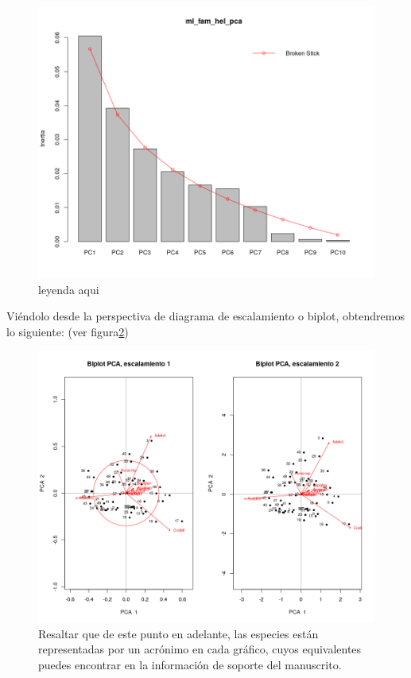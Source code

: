 \documentclass[11pt,]{article}
\begin{document}
\begin{figure}
\centering
\includegraphics{quebrada_especie.png}
\caption{\label{fig:quebrada_especie}leyenda aqui}
\end{figure}

Viéndolo desde la perspectiva de diagrama de escalamiento o biplot,
obtendremos lo siguiente: (ver figura\ref{fig:biplot_especie})

\begin{figure}
\centering
\includegraphics{biplot_especie.png}
\caption{\label{fig:biplot_especie}Resaltar que de este punto en
adelante, las especies están representadas por un acrónimo en cada
gráfico, cuyos equivalentes puedes encontrar en la información de
soporte del manuscrito.}
\end{figure}
\end{document}
